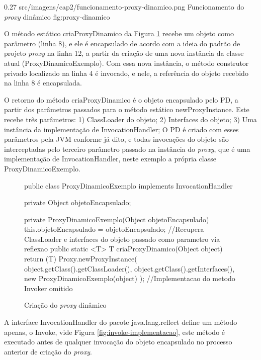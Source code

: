 \begin{image}
{0.27} %
{src/imagens/cap2/funcionamento-proxy-dinamico.png} %
{Funcionamento do \textit{proxy} dinâmico} %
{fig:proxy-dinamico} %
{\cite{guerra2014componentes}} %
\end{image}
\par O método estático criaProxyDinamico da Figura \ref{fig:cria-proxy-dinamico} recebe um objeto como parâmetro (linha 8), e ele é encapsulado de acordo com a ideia do padrão de projeto \textit{proxy} na linha 12, a partir da criação de uma nova instância da classe atual (ProxyDinamicoExemplo). Com essa nova instância, o método construtor privado localizado na linha 4 é invocado, e nele, a referência do objeto recebido na linha 8 é encapsulada.
\par O retorno do método criaProxyDinamico é o objeto encapsulado pelo PD, a partir dos parâmetros passados para o método estático newProxyInstance. Este recebe três parâmetros: 1) ClassLoader do objeto; 2) Interfaces do objeto; 3) Uma instância da implementação de InvocationHandler; O PD é criado com esses parâmetros pela JVM conforme já dito, e todas invocações do objeto são interceptadas pelo terceiro parâmetro passado na instância do \textit{proxy}, que é uma implementação de InvocationHandler, neste exemplo a própria classe ProxyDinamicoExemplo.

\begin{figure}[H]
    \centering
    \caption{Criação do \textit{proxy} dinâmico}
    \label{fig:cria-proxy-dinamico}
    \begin{java}
public class ProxyDinamicoExemplo implements InvocationHandler {
    	private Object objetoEncapsulado;

	private ProxyDinamicoExemplo(Object objetoEncapsulado) {
		this.objetoEncapsulado = objetoEncapsulado;
	}
//Recupera ClassLoader e interfaces do objeto passado como parametro via reflexao
	public static <T> T criaProxyDinamico(Object object) {
		return (T) Proxy.newProxyInstance(
        		object.getClass().getClassLoader(),
        		object.getClass().getInterfaces(),
        		new ProxyDinamicoExemplo(object)
		);
	}
//Implementacao do metodo Invoker omitido
}
    \end{java}
\end{figure}


\par A interface InvocationHandler do pacote java.lang.reflect define um método apenas, o Invoke, vide Figura \ref{fig:invoke-implementacao}, este método é executado antes de qualquer invocação do objeto encapsulado no processo anterior de criação do \textit{proxy}.

